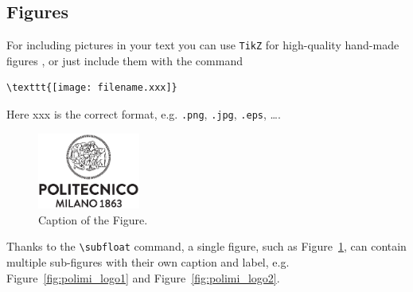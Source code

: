 \documentclass[11pt,a4paper]{article}
\begin{document}
\subsection{Figures}
\label{subsec:figures}

For including pictures in your text you can use \texttt{TikZ} for high-quality hand-made figures \cite{tikz},
or just include them with the command
\begin{verbatim}
\texttt{[image: filename.xxx]}
\end{verbatim}
Here xxx is the correct format, e.g.  \verb|.png|, \verb|.jpg|, \verb|.eps|, \dots.

\begin{figure}[H]
    \centering
    \includegraphics[width=0.3\textwidth]{logo_polimi_scritta.eps}
    \caption{Caption of the Figure.}
    \label{fig:quadtree}
\end{figure}

Thanks to the \texttt{\textbackslash subfloat} command, a single figure, such as Figure~\ref{fig:quadtree},
can contain multiple sub-figures with their own caption and label, e.g. Figure~\ref{fig:polimi_logo1} and Figure~\ref{fig:polimi_logo2}.
\end{document}
